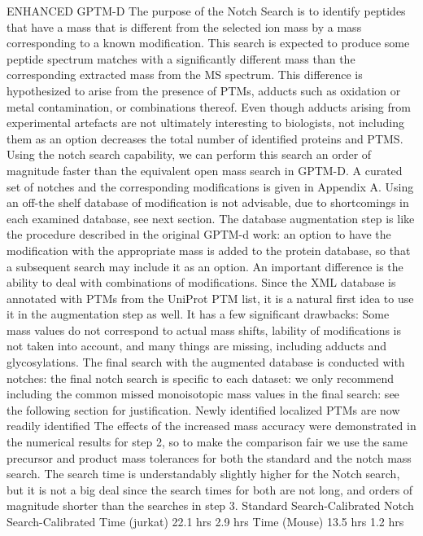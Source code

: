\documentclass[journal=jprobs,manuscript=article]{achemso}
\begin{document}
ENHANCED GPTM-D
The purpose of the Notch Search is to identify peptides that have a mass that is different from the selected ion mass by a mass corresponding to a known modification. This search is expected to produce some peptide spectrum matches with a significantly different mass than the corresponding extracted mass from the MS spectrum. This difference is hypothesized to arise from the presence of PTMs, adducts such as oxidation or metal contamination, or combinations thereof. Even though adducts arising from experimental artefacts are not ultimately interesting to biologists, not including them as an option decreases the total number of identified proteins and PTMS. Using the notch search capability, we can perform this search an order of magnitude faster than the equivalent open mass search in GPTM-D. A curated set of notches and the corresponding modifications is given in Appendix A. Using an off-the shelf database of modification is not advisable, due to shortcomings in each examined database, see next section.
The database augmentation step is like the procedure described in the original GPTM-d work: an option to have the modification with the appropriate mass is added to the protein database, so that a subsequent search may include it as an option. An important difference is the ability to deal with combinations of modifications.
Since the XML database is annotated with PTMs from the UniProt PTM list, it is a natural first idea to use it in the augmentation step as well. It has a few significant drawbacks: Some mass values do not correspond to actual mass shifts, lability of modifications is not taken into account, and many things are missing, including adducts and glycosylations.
The final search with the augmented database is conducted with notches: the final notch search is specific to each dataset: we only recommend including the common missed monoisotopic mass values in the final search: see the following section for justification. Newly identified localized PTMs are now readily identified
The effects of the increased mass accuracy were demonstrated in the numerical results for step 2, so to make the comparison fair we use the same precursor and product mass tolerances for both the standard and the notch mass search. The search time is understandably slightly higher for the Notch search, but it is not a big deal since the search times for both are not long, and orders of magnitude shorter than the searches in step 3. 
	Standard Search-Calibrated	Notch Search-Calibrated
Time (jurkat)	22.1 hrs	2.9 hrs
Time (Mouse)	13.5 hrs	1.2 hrs
\end{document}
